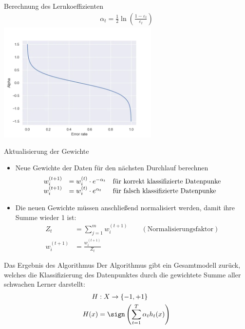\documentclass[hyperref={bookmarks=false},11pt,dvipsnames]{beamer}
\begin{document}
\begin{frame}[t]{Berechnung des Lernkoeffizienten}
	\begin{align*}
		\alpha_t =\frac{1}{2}\ln\left(\frac{1-\varepsilon_t}{\varepsilon_t}\right)
	\end{align*}
	\centering\includegraphics[width=0.6\textwidth]{../Ausarbeitung/figures/alpha_graph.png}
\end{frame}

\begin{frame}[t]{Aktualisierung der Gewichte}
	\begin{itemize}
		\item <1-> Neue Gewichte der Daten für den nächsten Durchlauf berechnen
		      \begin{align*}
			      \begin{array}{l l l}
				      w^{(t+1)}_i & = w^{(t)}_i \cdot e^{-\alpha_t} & \text{für korrekt klassifizierte Datenpunke} \\
				      w^{(t+1)}_i & = w^{(t)}_i \cdot e^{\alpha_t}  & \text{für falsch klassifizierte Datenpunke}
			      \end{array}
		      \end{align*}
		\item <2-> Die neuen Gewichte müssen anschließend normalisiert werden, damit ihre Summe wieder 1 ist:
		      \begin{align*}
			      Z_t         & =\sum_{j=1}^m w^{(t+1)}_i\qquad(\text{Normalisierungsfaktor}) \\
			      w^{(t+1)}_i & = \frac{w^{(t+1)}_i}{Z_t}
		      \end{align*}
	\end{itemize}
\end{frame}

\begin{frame}[t]{Das Ergebnis des Algorithmus}
	Der Algorithmus gibt ein Gesamtmodell zurück, welches die Klassifizierung des Datenpunktes durch die gewichtete
	Summe aller schwachen Lerner darstellt:
	\begin{align*}
		H    & :      X \rightarrow \{-1, +1\}                 \\
		H(x) & =  \sign\left(\sum_{t=1}^T\alpha_th_t(x)\right)
	\end{align*}
\end{frame}
\end{document}
